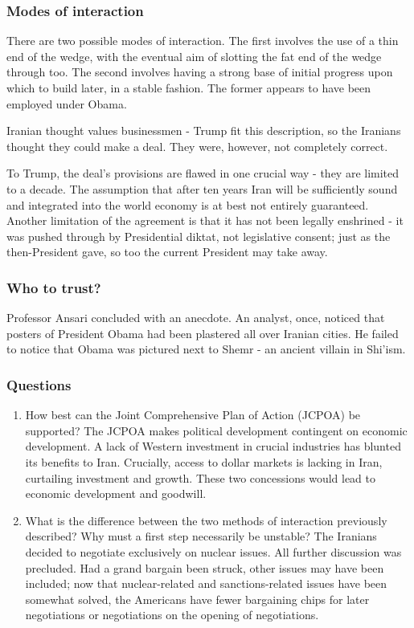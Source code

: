 	\subsubsection{Modes of interaction}\label{modes-of-interaction}

	There are two possible modes of interaction. The first involves the use
	of a thin end of the wedge, with the eventual aim of slotting the fat
	end of the wedge through too. The second involves having a strong base
	of initial progress upon which to build later, in a stable fashion. The
	former appears to have been employed under Obama.

	Iranian thought values businessmen - Trump fit this description, so the
	Iranians thought they could make a deal. They were, however, not
	completely correct.

	To Trump, the deal's provisions are flawed in one crucial way - they are
	limited to a decade. The assumption that after ten years Iran will be
	sufficiently sound and integrated into the world economy is at best not
	entirely guaranteed. Another limitation of the agreement is that it has
	not been legally enshrined - it was pushed through by Presidential
	diktat, not legislative consent; just as the then-President gave, so too
	the current President may take away.

	\subsubsection{Who to trust?}\label{who-to-trust}

	Professor Ansari concluded with an anecdote. An analyst, once, noticed
	that posters of President Obama had been plastered all over Iranian
	cities. He failed to notice that Obama was pictured next to Shemr - an
	ancient villain in Shi'ism.

	\subsubsection{Questions}\label{questions}

	\begin{enumerate}
		\def\labelenumi{\arabic{enumi}.}
		\item
		How best can the Joint Comprehensive Plan of Action (JCPOA) be
		supported? The JCPOA makes political development contingent on
		economic development. A lack of Western investment in crucial
		industries has blunted its benefits to Iran. Crucially, access to
		dollar markets is lacking in Iran, curtailing investment and growth.
		These two concessions would lead to economic development and goodwill.
		\item
		What is the difference between the two methods of interaction
		previously described? Why must a first step necessarily be unstable?
		The Iranians decided to negotiate exclusively on nuclear issues. All
		further discussion was precluded. Had a grand bargain been struck,
		other issues may have been included; now that nuclear-related and
		sanctions-related issues have been somewhat solved, the Americans have
		fewer bargaining chips for later negotiations or negotiations on the
		opening of negotiations.
	\end{enumerate}



